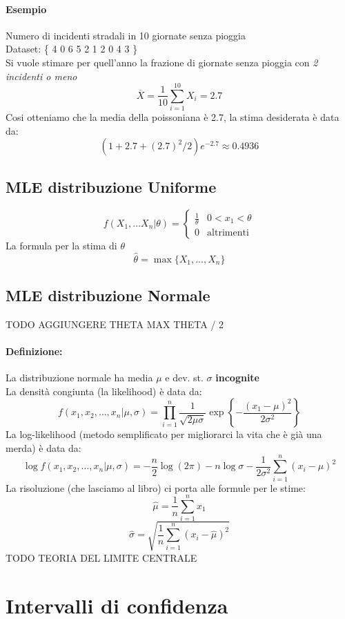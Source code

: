 \documentclass[]{article}
\newcommand{\definizione}{\paragraph{Definizione:}}
\begin{document}
    \paragraph{Esempio} Numero di incidenti stradali in 10 giornate senza pioggia \\
    Dataset: \{ 4 0 6 5 2 1 2 0 4 3 \} \\
    Si vuole stimare per quell'anno la frazione di giornate senza pioggia con \textit{2 incidenti o meno}
    \[ \overline{X} = \frac{1}{10} \sum_{i = 1}^{10} X_i = \boldsymbol{2.7} \]
    Cosi otteniamo che la media della poissoniana è 2.7, la stima desiderata è data da:
    \[ (1+2.7+ (2.7)^2 /2 ) e^{-2.7} \approx 0.4936 \]
    \subsection{MLE distribuzione Uniforme}
    \begin{equation*}
        f(X_1, \ldots X_n \rvert \theta) =
        \begin{cases}
            \frac{1}{\theta} & 0 < x_1 < \theta \\
            0 & \text{altrimenti}
        \end{cases}
    \end{equation*}
    La formula per la stima di $\theta$
    \[ \hat{\theta} = \max \{ X_1, \ldots, X_n \} \]
    \subsection{MLE distribuzione Normale} 
    TODO AGGIUNGERE THETA MAX THETA / 2
    \definizione La distribuzione normale ha media $\mu$ e dev. st. $\sigma$ \textbf{incognite} \\
    La densità congiunta (la likelihood) è data da:
    \[ f(x_1, x_2, \ldots, x_n \rvert \mu, \sigma) = \prod_{i= 1}^{n} \frac{1}{\sqrt{2 \mu \sigma}} \exp \left \{ - \frac{(x_1-\mu)^2}{2 \sigma^2} \right \} \]
    La log-likelihood (metodo semplificato per migliorarci la vita che è già una merda) è data da:
    \[ \log f(x_1, x_2, \ldots, x_n \rvert \mu, \sigma) = - \frac{n}{2} \log(2\pi) - n \log \sigma - \frac{1}{2\sigma^2} \sum_{i = 1}^{n} (x_i - \mu)^2 \]
    La risoluzione (che lasciamo al libro) ci porta alle formule per le stime:
    \[ \hat{\mu} = \frac{1}{n} \sum_{i = 1}^{n} x_1 \]
    \[ \hat{\sigma} = \sqrt{\frac{1}{n} \sum_{i = 1}^{n}(x_i - \hat{\mu})^2 } \]
    TODO TEORIA DEL LIMITE CENTRALE
    \section{Intervalli di confidenza}
\end{document}

